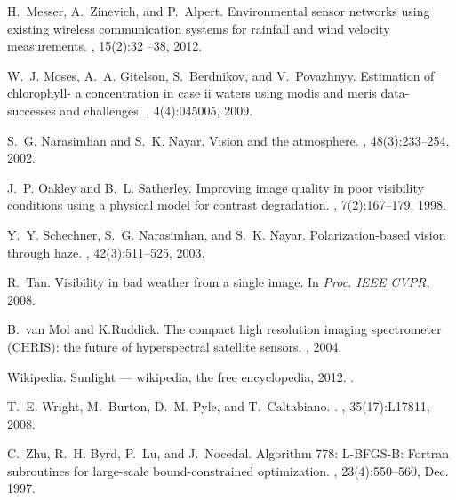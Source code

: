 \documentclass[10pt,twocolumn,letterpaper]{article}
\begin{document}
{\begin{thebibliography}{10}
H.~Messer, A.~Zinevich, and P.~Alpert.
\newblock Environmental sensor networks using existing wireless communication
  systems for rainfall and wind velocity measurements.
, 15(2):32 --38,
  2012.

W.~J. Moses, A.~A. Gitelson, S.~Berdnikov, and V.~Povazhnyy.
\newblock Estimation of chlorophyll- a concentration in case ii waters using
  modis and meris data-successes and challenges.
, 4(4):045005, 2009.

S.~G. Narasimhan and S.~K. Nayar.
\newblock Vision and the atmosphere.
, 48(3):233--254,  2002.

J.~P. Oakley and B.~L. Satherley.
\newblock Improving image quality in poor visibility conditions using a
  physical model for contrast degradation.
, 7(2):167--179, 1998.

Y.~Y. Schechner, S.~G. Narasimhan, and S.~K. Nayar.
\newblock Polarization-based vision through haze.
, 42(3):511--525, 2003.

R.~Tan.
\newblock Visibility in bad weather from a single image.
\newblock In {\em Proc. IEEE CVPR}, 2008.

B.~van Mol and K.Ruddick.
\newblock The compact high resolution imaging spectrometer (CHRIS): the future
  of hyperspectral satellite sensors.
, 2004.

Wikipedia.
\newblock Sunlight --- wikipedia{,} the free encyclopedia, 2012.
.

T.~E. Wright, M.~Burton, D.~M. Pyle, and T.~Caltabiano.
.
, 35(17):L17811, 2008.

C.~Zhu, R.~H. Byrd, P.~Lu, and J.~Nocedal.
\newblock Algorithm 778: L-BFGS-B: Fortran subroutines for large-scale
  bound-constrained optimization.
, 23(4):550--560, Dec. 1997.

\end{thebibliography}



}
\end{document}

